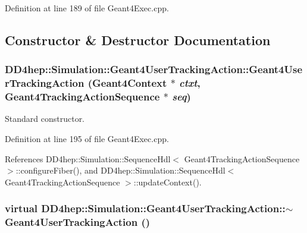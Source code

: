 Definition at line 189 of file Geant4Exec.cpp.

\subsection{Constructor \& Destructor Documentation}
\hypertarget{class_d_d4hep_1_1_simulation_1_1_geant4_user_tracking_action_acee865c27f15ffd9f2d4c386f9ab7e8e}{
\subsubsection[{Geant4UserTrackingAction}]{\setlength{\rightskip}{0pt plus 5cm}DD4hep::Simulation::Geant4UserTrackingAction::Geant4UserTrackingAction ({\bf Geant4Context} $\ast$ {\em ctxt}, \/  {\bf Geant4TrackingActionSequence} $\ast$ {\em seq})}}
\label{class_d_d4hep_1_1_simulation_1_1_geant4_user_tracking_action_acee865c27f15ffd9f2d4c386f9ab7e8e}


Standard constructor. 

Definition at line 195 of file Geant4Exec.cpp.

References DD4hep::Simulation::SequenceHdl$<$ Geant4TrackingActionSequence $>$::configureFiber(), and DD4hep::Simulation::SequenceHdl$<$ Geant4TrackingActionSequence $>$::updateContext().\hypertarget{class_d_d4hep_1_1_simulation_1_1_geant4_user_tracking_action_a2c2e499d1ac638f2519fa8f6f221bdc0}{
\subsubsection[{$\sim$Geant4UserTrackingAction}]{\setlength{\rightskip}{0pt plus 5cm}virtual DD4hep::Simulation::Geant4UserTrackingAction::$\sim$Geant4UserTrackingAction ()}}
\label{class_d_d4hep_1_1_simulation_1_1_geant4_user_tracking_action_a2c2e499d1ac638f2519fa8f6f221bdc0}


